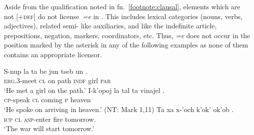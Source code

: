 \documentclass[output=paper,
modfonts
]{LSP/langsci}
\begin{document}
Aside from the qualification noted in fn.~\ref{footnote:clausal}, elements which are not [\textsc{+def}] do not license\ \emph{=e} in . 
This includes lexical categories (nouns, verbs, adjectives),
related semi- like auxiliaries, and  like the indefinite article,
prepositions, negation,  markers, coordinators, etc.  
Thus,  \emph{=e} does not occur in the position marked by the asterisk in any of the following examples
 as none of them contains an appropriate licensor.
\begin{exe}
\ex
\begin{xlist}
\gll S-nup la ta be jun tseb un \textasteriskcentered.    \\
\textsc{erg.3}-meet \textsc{cl} on path \textsc{indf} girl \textsc{par} \\
\glt `He met a girl on the path.' \citep[306]{laughlin1977}  
\gll  I-k'opoj la tal ta vinajel \textasteriskcentered.  \\
\textsc{cp}-speak \textsc{cl} coming \textsc{p} heaven\\
\glt `He spoke on arriving in heaven.' (NT: Mark 1,11)
 \gll Ta xa x-'och k'ok' ok'ob \textasteriskcentered. \\
\textsc{icp} \textsc{cl} \textsc{asp}-enter fire tomorrow. \\
\glt `The war will start tomorrow.' \citep[119]{laughlin1977} 
\end{xlist}
\label{exe:licensors}
\end{exe}
\end{document}
